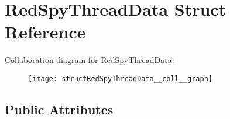 \hypertarget{structRedSpyThreadData}{\section{Red\-Spy\-Thread\-Data Struct Reference}
\label{structRedSpyThreadData}
}


Collaboration diagram for Red\-Spy\-Thread\-Data\-:
\nopagebreak
\begin{figure}[H]
\begin{center}
\leavevmode
\texttt{[image: structRedSpyThreadData\_\_coll\_\_graph]}
\end{center}
\end{figure}
\subsection*{Public Attributes}
